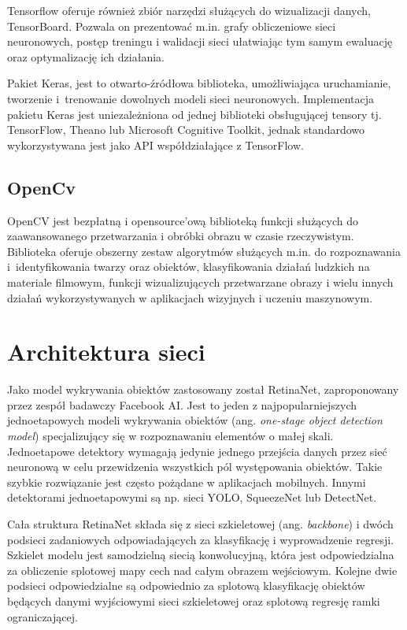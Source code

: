 Tensorflow oferuje również zbiór narzędzi służących do wizualizacji danych, TensorBoard. Pozwala on prezentować m.in. grafy obliczeniowe sieci neuronowych, postęp treningu i walidacji sieci ułatwiając tym samym ewaluację oraz optymalizację ich działania.

Pakiet Keras, jest to otwarto-źródłowa biblioteka, umożliwiająca uruchamianie, tworzenie i~trenowanie dowolnych modeli sieci neuronowych. Implementacja pakietu Keras jest uniezależniona od jednej biblioteki obsługującej tensory tj. TensorFlow, Theano lub Microsoft Cognitive Toolkit, jednak standardowo wykorzystywana jest jako API współdziałające z TensorFlow.


\subsection{OpenCv}
\hspace{0.5cm}OpenCV jest bezpłatną i opensource'ową biblioteką funkcji służących do zaawansowanego przetwarzania i obróbki obrazu w czasie rzeczywistym. Biblioteka oferuje obszerny zestaw algorytmów służących m.in. do rozpoznawania i~identyfikowania twarzy oraz obiektów, klasyfikowania działań ludzkich na materiale filmowym\cite{OpenCV}, funkcji wizualizujących przetwarzane obrazy i wielu innych działań wykorzystywanych w aplikacjach wizyjnych i uczeniu maszynowym.

\section{Architektura sieci}
\hspace{0.5cm}
Jako model wykrywania obiektów zastosowany został RetinaNet, zaproponowany przez zespół badawczy Facebook AI. Jest to jeden z najpopularniejszych jednoetapowych modeli wykrywania obiektów (ang. \emph{one-stage object detection model}) specjalizujący się w rozpoznawaniu elementów o małej skali. Jednoetapowe detektory wymagają jedynie jednego przejścia danych przez sieć neuronową w celu przewidzenia wszystkich pól występowania obiektów. Takie szybkie rozwiązanie jest często pożądane w aplikacjach mobilnych. Innymi detektorami jednoetapowymi są np. sieci YOLO, SqueezeNet lub DetectNet.

Cała struktura RetinaNet składa się z sieci szkieletowej (ang. \emph{backbone}) i dwóch podsieci zadaniowych odpowiadających za klasyfikację i wyprowadzenie regresji. Szkielet modelu jest samodzielną siecią konwolucyjną, która jest odpowiedzialna za obliczenie splotowej mapy cech nad całym obrazem wejściowym. Kolejne dwie podsieci odpowiedzialne są odpowiednio za splotową klasyfikację obiektów będących danymi wyjściowymi sieci szkieletowej oraz splotową regresję ramki ograniczającej.


